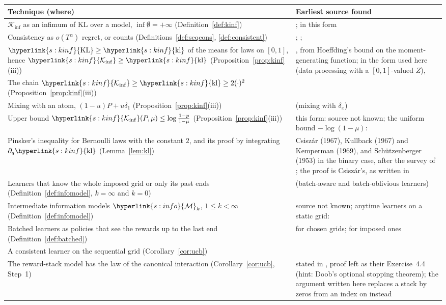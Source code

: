 \documentclass[11pt]{article}
\newcommand{\sy}[2]{{\hyperlink{#1}{#2}}}
\newcommand{\1}{\mathbf{1}}
\newcommand{\KL}{\sy{s:kinf}{\mathrm{KL}}}
\newcommand{\kl}{\sy{s:kinf}{\mathrm{kl}}}
\newcommand{\Ki}{\sy{s:kinf}{\mathcal K_{\inf}}}
\newcommand{\Mk}[1]{\sy{s:info}{\mathcal M}_{#1}}
\begin{document}
\begin{center}
\begin{tabular}{@{}p{}p{}@{}}
\toprule
Technique (where) & Earliest source found \\
\midrule
$\mathcal K_{\inf}$ as an infimum of $\mathrm{KL}$ over a model, $\inf\emptyset=+\infty$ (Definition~\ref{def:kinf}) & \citet{BK96}; in this form \citet[Section~1.2]{GMS19} \\
Consistency as $o(T^\alpha)$ regret, or counts (Definitions~\ref{def:seqcons}, \ref{def:consistent}) & \citet{LR85}; \citet[Definition~16.1]{LS}; \citet[Definition~1]{GMS19} \\
$\KL\ge\kl$ of the means for laws on $[0,1]$, hence $\Ki\ge\kl$ (Proposition~\ref{prop:kinf}(iii)) & \citet[Section~6.1]{CGMMS13}, from Hoeffding's bound on the moment-generating function; in the form used here (data processing with a $[0,1]$-valued $Z$), \citet[Lemma~1]{GMS19} \\
The chain $\Ki\ge\kl\ge2(\cdot)^2$ (Proposition~\ref{prop:kinf}(iii)) & \citet[(7)]{GHMS22} \\
Mixing with an atom, $(1-u)P+u\delta_1$ (Proposition~\ref{prop:kinf}(iii)) & \citet[Appendix~B.1]{GHMS22} (mixing with $\delta_x$) \\
Upper bound $\Ki(P,\mu)\le\log\frac{1-p}{1-\mu}$ (Proposition~\ref{prop:kinf}(iii)) & this form: source not known; the uniform bound $-\log(1-\mu)$: \citet[Lemma~14]{HT10} \\
Pinsker's inequality for Bernoulli laws with the constant $2$, and its proof by integrating $\partial_q\kl$ (Lemma~\ref{lem:kl}) & Csisz\'ar (1967), Kullback (1967) and Kemperman (1969), and Sch\"utzenberger (1953) in the binary case, after the survey of \citet[Sections~3--4]{Rio23}; the proof is Csisz\'ar's, as written in \citet[(16)]{Rio23} \\
Learners that know the whole imposed grid or only its past ends (Definition~\ref{def:infomodel}, $k=\infty$ and $k=0$) & \citet{QW26} (batch-aware and batch-oblivious learners) \\
Intermediate information models $\Mk{k}$, $1\le k<\infty$ (Definition~\ref{def:infomodel}) & source not known; anytime learners on a static grid: \citet{JTXHXG21} \\
Batched learners as policies that see the rewards up to the last end (Definition~\ref{def:batched}) & \citet{PRCS16} for chosen grids; \citet{QW26} for imposed ones \\
A consistent learner on the sequential grid (Corollary~\ref{cor:ucb}) & \citet[Theorem~1]{ACF02} \\
The reward-stack model has the law of the canonical interaction (Corollary~\ref{cor:ucb}, Step~1) & stated in \citet[Section~4.6]{LS}, proof left as their Exercise~4.4 (hint: Doob's optional stopping theorem); the argument written here replaces a stack by zeros from an index on instead \\
\bottomrule
\end{tabular}
\end{center}
\end{document}
